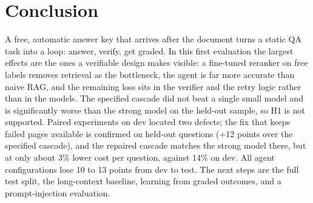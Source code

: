 \documentclass[11pt]{article}
\begin{document}
\section{Conclusion}
A free, automatic answer key that arrives after the document turns a static QA task into a loop: answer, verify, get graded. In this first evaluation the largest effects are the ones a verifiable design makes visible: a fine-tuned reranker on free labels removes retrieval as the bottleneck, the agent is far more accurate than naive RAG, and the remaining loss sits in the verifier and the retry logic rather than in the models. The specified cascade did not beat a single small model and is significantly worse than the strong model on the held-out sample, so H1 is not supported. Paired experiments on dev located two defects; the fix that keeps failed pages available is confirmed on held-out questions (+12 points over the specified cascade), and the repaired cascade matches the strong model there, but at only about 3\% lower cost per question, against 14\% on dev. All agent configurations lose 10 to 13 points from dev to test. The next steps are the full test split, the long-context baseline, learning from graded outcomes, and a prompt-injection evaluation.

{\small\setlength{\bibsep}{2pt}

}
\end{document}
